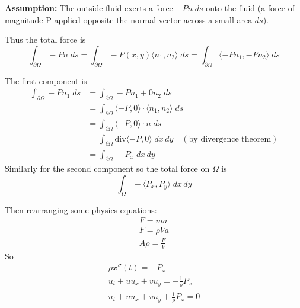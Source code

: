 \documentclass[12pt]{article}
\newcommand{\brak}[1]{\langle #1 \rangle}
\renewcommand{\div}{\text{div}}
\begin{document}
\textbf{Assumption:} The outside fluid exerts a force $-Pn\; ds$ onto the fluid (a force of magnitude P applied opposite the normal vector across a small area $ds$).

Thus the total force is 
\[\int_{\partial \Omega} -Pn\;ds = \int_{\partial \Omega} -P(x, y)\brak{n_1, n_2}\; ds = \int_{\partial \Omega} \brak{-Pn_1, -Pn_2}\; ds\]

The first component is 
\begin{align*}
    \int_{\partial \Omega} -Pn_1 \; ds &= \int_{\partial \Omega} -Pn_1 + 0n_2 \; ds\\
    &= \int_{\partial \Omega} \brak{-P, 0} \cdot \brak{n_1, n_2}\; ds\\
    &= \int_{\partial \Omega} \brak{-P, 0} \cdot n\; ds\\
    &= \int_{\partial \Omega} \div \brak{-P, 0}\; dx\, dy \quad (\text{by divergence theorem})\\
    &= \int_{\partial \Omega} -P_x\; dx \, dy
\end{align*}
Similarly for the second component so the total force on $\Omega$ is 
\[\int_{\Omega} -\brak{P_x, P_y}\; dx\, dy\]

Then rearranging some physics equations:
\begin{gather*}
    F = ma\\
    F = \rho Va\\
    A\rho = \frac{F}{V}
\end{gather*}
So 
\begin{gather*}
    \rho x''(t) = -P_x\\
    u_t + uu_x + vu_y = -\frac{1}{\rho} P_x\\
    \boxed{u_t + uu_x + vu_y + \frac{1}{\rho} P_x = 0}
\end{gather*}
\end{document}
